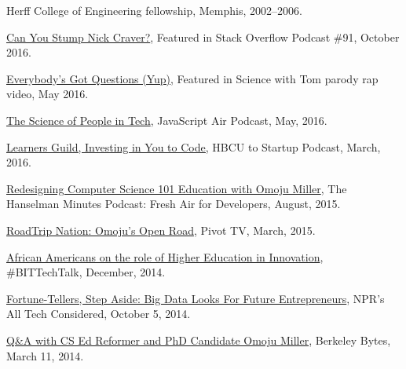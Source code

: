 \documentclass[11pt,article,oneside]{memoir}
\begin{document}
\ind Herff College of Engineering fellowship, Memphis, 2002--2006.

\bigskip 

\medskip

\ind \href{ttps://soundcloud.com/stack-exchange/stack-overflow-podcast-91-can-you-stump-nick-craver}{Can You Stump Nick Craver?}, Featured in Stack Overflow Podcast \#91, October 2016.

\ind \href{https://www.youtube.com/watch?v=q5mmE05e82I&ab_channel=ScienceWithTom}{Everybody's Got Questions (Yup)}, Featured in Science with Tom parody rap video, May 2016.

\ind \href{http://audio.javascriptair.com/e/022-jsair-the-science-of-people-in-tech-with-kate-edwards-omoju-miller-and-steve-andrews/}{The Science of People in Tech}, JavaScript Air Podcast, May, 2016.

\ind \href{https://www.youtube.com/watch?v=T0wQRr4RuqM&ab_channel=HBCUtoStartup}{Learners Guild, Investing in You to Code,} HBCU to Startup Podcast, March, 2016.

\ind \href{http://hanselminutes.com/488/redesigning-computer-science-101-education-with-omoju-miller}{Redesigning Computer Science 101 Education with Omoju Miller}, The Hanselman Minutes Podcast: Fresh Air for Developers, August, 2015.

\ind \href{http://roadtripnation.com/leader/omoju-miller}{RoadTrip Nation: Omoju's Open Road}, Pivot TV, March, 2015.

\ind \href{https://www.blacksintechnology.net/the-road-to-50-podcast-african-americans-on-the-role-of-higher-education-in-innovation/}{African Americans on the role of Higher Education in Innovation}, \#BITTechTalk, December, 2014.

\ind \href{http://www.npr.org/sections/alltechconsidered/2014/10/05/351851015/fortune-tellers-step-aside-big-data-looks-for-future-entrepreneurs}{Fortune-Tellers, Step Aside: Big Data Looks For Future Entrepreneurs}, NPR's  All Tech Considered, October 5, 2014.

\ind \href{http://best.berkeley.edu/2015/03/11/best-labber-in-berkeley-byte-qa-with-cs-ed-reformer-and-phd-candidate-omoju-miller/}{Q\&A with CS Ed Reformer and PhD Candidate Omoju Miller}, Berkeley Bytes, March 11, 2014.
\end{document}
